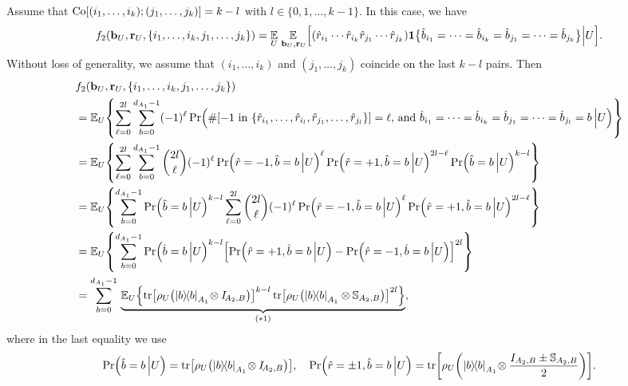 \documentclass[aps,prl,twocolumn,nofootinbib,superscriptaddress,10pt]{revtex4-2}
\let\originalleft\left
\let\originalright\right
\renewcommand{\left}{\mathopen{}\mathclose\bgroup\originalleft}
\renewcommand{\right}{\aftergroup\egroup\originalright}
\def\E{ {\mathbb E} } %
\newcommand{\ketbra}[2]{\ensuremath{\left|#1\right\rangle\!\left\langle#2\right|}}
\DeclareMathOperator{\Tr}{tr}
\theoremstyle{plain}
\theoremstyle{definition}
\begin{document}
Assume that ${\rm Co}[(i_1,\dots,i_k);(j_1,\dots,j_k)]=k-l$ with $l\in\{0,1,\dots,k-1\}$. In this case, we have 
\begin{align}\label{eq:PTVariance2} 
f_2\left( \mathbf{b}_{U},\mathbf{r}_{U},\left\lbrace i_1,\dots,i_k,j_1,\dots,j_k\right\rbrace \right)
=\underset{U }{\E} \, \underset{\,\mathbf{b}_{U},\mathbf{r}_{U}}{\E}   
\Big[ \left( \hat{r}_{i_1}\cdots \hat{r}_{i_k} \hat{r}_{j_1}\cdots \hat{r}_{j_k} \right) 
\textbf{1}\big\{\hat{b}_{i_1}=\dots=\hat{b}_{i_k}=\hat{b}_{j_1}=\dots=\hat{b}_{j_k}\big\} \Big| U \Big].
\end{align}
Without loss of generality, we assume that $(i_1,\dots,i_k)$ and $(j_1,\dots,j_k)$ coincide on the last $k-l$ pairs. 
Then 
\begin{align}\label{eq:PTVariance3} 
&f_2\left( \mathbf{b}_{U},\mathbf{r}_{U},\left\lbrace i_1,\dots,i_k,j_1,\dots,j_k\right\rbrace \right)
\nonumber\\
&= \E_{U} \left\lbrace \sum_{\ell=0}^{2l} \sum_{b=0}^{d_{A_1}-1} (-1)^{\ell} 
\Pr\left(\#\left[ \text{$-1$ in $\left\lbrace \hat{r}_{i_1},\dots, \hat{r}_{i_l},\hat{r}_{j_1},\dots,\hat{r}_{j_l}\right\rbrace $}\right] =\ell,\, \text{and } \hat{b}_{i_1}=\dots=\hat{b}_{i_k}=\hat{b}_{j_1}=\dots=\hat{b}_{j_{l}}=b \,\Big| U \right)  \right\rbrace 
\nonumber \\
&= \E_{U} \left\lbrace \sum_{\ell=0}^{2l} \sum_{b=0}^{d_{A_1}-1} \binom{2l}{\ell} (-1)^{\ell} 
\Pr\left(\hat{r}=-1, \hat{b}=b \,\Big| U\right)^\ell 
\Pr\left(\hat{r}=+1, \hat{b}=b \,\Big| U\right)^{2l-\ell} 
\Pr\left(\hat{b}=b \,\Big| U\right)^{k-l} \right\rbrace 
\nonumber \\
&= \E_{U} \left\lbrace \sum_{b=0}^{d_{A_1}-1} \Pr\left(\hat{b}=b \,\Big| U\right)^{k-l}
\sum_{\ell=0}^{2l} \binom{2l}{\ell} (-1)^{\ell} 
\Pr\left(\hat{r}=-1, \hat{b}=b \,\Big| U\right)^\ell 
\Pr\left(\hat{r}=+1, \hat{b}=b \,\Big| U\right)^{2l-\ell} 
\right\rbrace 
\nonumber \\
&= \E_{U} \left\lbrace \sum_{b=0}^{d_{A_1}-1} \Pr\left(\hat{b}=b \,\Big| U\right)^{k-l}
\left[ \Pr\left(\hat{r}=+1, \hat{b}=b\,\Big| U\right)-\Pr\left(\hat{r}=-1, \hat{b}=b \,\Big| U\right) \right]^{2l}
\right\rbrace 
\nonumber \\
&= \sum_{b=0}^{d_{A_1}-1} \,\underbrace{ \E_{U} \left\lbrace 
\Tr\left[\rho_{U} \left( \ketbra{b}{b}_{A_1}\!\otimes I_{\!A_2,B} \right)  \right]^{k-l}
\Tr\left[\rho_{U} \left( \ketbra{b}{b}_{A_1} \otimes \mathbb{S}_{A_2,B} \right)  \right]^{2l}
\right\rbrace}_{(*1)}, 
\end{align}
where in the last equality we use 
\begin{align}\label{eq:Pr+-}
\Pr\left(\hat{b}=b\,\Big| U\right) =\Tr\left[\rho_{U} \left( \ketbra{b}{b}_{A_1}\!\otimes I_{\!A_2,B} \right)  \right],
\quad
\Pr\left(\hat{r}=\pm 1, \hat{b}=b\,\Big| U\right) = 
\Tr\left[\rho_{U} \left( \ketbra{b}{b}_{A_1} \!\otimes \frac{I_{A_2,B}\pm\mathbb{S}_{A_2,B}}{2} \right)  \right].  
\end{align}
\end{document}
